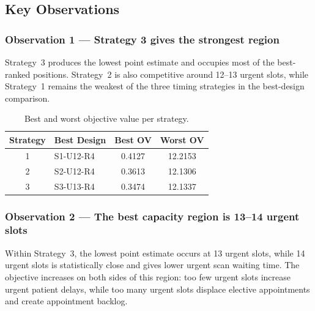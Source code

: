\documentclass[12pt, a4paper]{article}
\newcommand{\headerrow}{\rowcolor{ugblue}\color{white}}
\newcommand{\altrow}{\rowcolor{rowgray}}
\begin{document}
\subsection{Key Observations}

\subsubsection{Observation 1 --- Strategy 3 gives the strongest region}

Strategy~3 produces the lowest point estimate and occupies most of the best-ranked positions. Strategy~2 is also competitive around 12--13 urgent slots, while Strategy~1 remains the weakest of the three timing strategies in the best-design comparison.

\begin{table}[ht]
\centering
\caption{Best and worst objective value per strategy.}
\label{tab:per_strategy}
\small
\begin{tabular}{clcc}
\toprule
\headerrow \textbf{Strategy} & \textbf{Best Design} & \textbf{Best OV} & \textbf{Worst OV} \\
\midrule
1 & S1-U12-R4 & 0.4127 & 12.2153 \\
\altrow 2 & S2-U12-R4 & 0.3613 & 12.1306 \\
3 & S3-U13-R4 & 0.3474 & 12.1337 \\
\bottomrule
\end{tabular}
\end{table}

\subsubsection{Observation 2 --- The best capacity region is 13--14 urgent slots}

Within Strategy~3, the lowest point estimate occurs at 13 urgent slots, while 14 urgent slots is statistically close and gives lower urgent scan waiting time. The objective increases on both sides of this region: too few urgent slots increase urgent patient delays, while too many urgent slots displace elective appointments and create appointment backlog.
\end{document}
